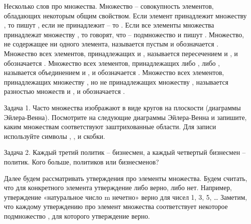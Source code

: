 \documentclass[a4paper,11pt]{article}
\begin{document}



Несколько слов про множества.
Множество – совокупность элементов, обладающих некоторым общим свойством.
Если элемент   принадлежит множеству  , то пишут  , если не принадлежит – то  .
Если все элементы множества   принадлежат множеству  , то говорят, что   – подмножество   и пишут  .
Множество, не содержащее ни одного элемента, называется пустым и обозначается  .
Множество всех элементов, принадлежащих  и  , называется пересечением   и  , и обозначается  .
Множество всех элементов, принадлежащих либо , либо , называется объединением   и  , и обозначается  .
Множество всех элементов, принадлежащих множеству  , но не принадлежащих множеству  , называется разностью множеств   и  , и обозначается  .

Задача 1. Часто множества изображают в виде кругов на плоскости (диаграммы Эйлера-Венна). Посмотрите на следующие диаграммы Эйлера-Венна и запишите, каким множествам соответствуют заштрихованные области. Для записи используйте символы  ,  ,   и скобки.

Задача 2. Каждый третий политик – бизнесмен, а каждый четвертый бизнесмен – политик. Кого больше, политиков или бизнесменов?

Далее будем рассматривать утверждения про элементы множества. Будем считать, что для конкретного элемента утверждение либо верно, либо нет. Например, утверждение «натуральное число m нечетно» верно для чисел 1, 3, 5, …
Заметим, что каждому утверждению   про элемент множества   соответствует некоторое подмножество  , для которого утверждение верно.
\end{document}
